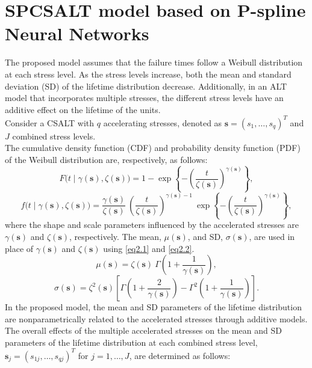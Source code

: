 \documentclass[twoside]{article}
\begin{document}
\section{SPCSALT model based on P-spline Neural Networks}\label{sec2}
The proposed model assumes that the failure times follow a Weibull distribution at each stress level. As the stress levels increase, both the mean and standard deviation (SD) of the lifetime distribution decrease. Additionally, in an ALT model that incorporates multiple stresses, the different stress levels have an additive effect on the lifetime of the units.\\
Consider a CSALT with $q$ accelerating stresses, denoted as $\boldsymbol{s}=(s_{1},\ldots,s_{q})^{T}$ and $J$ combined stress levels.\\
The cumulative density function (CDF) and probability density function (PDF) of the Weibull distribution are, respectively, as follows: 
\begin{equation*}
F\big(t \mid \gamma(\boldsymbol{s}), \zeta(\boldsymbol{s}) \big) = 1  - \exp\left\{ -\left(\dfrac{t}{\zeta(\boldsymbol{s})}\right)^{\gamma(\boldsymbol{s})} \right\},
\end{equation*}
\begin{equation*}
f\big(t \mid \gamma(\boldsymbol{s}), \zeta(\boldsymbol{s}) \big) = \dfrac{\gamma(\boldsymbol{s})}{\zeta(\boldsymbol{s})} \: \left(\dfrac{t}{\zeta(\boldsymbol{s})}\right)^{\gamma(\boldsymbol{s}) - 1} \: \exp\left\{ -\left(\dfrac{t}{\zeta(\boldsymbol{s})}\right)^{\gamma(\boldsymbol{s})} \right\},
\end{equation*}
where the shape and scale parameters influenced by the accelerated stresses are $\gamma(\boldsymbol{s})$ and $\zeta(\boldsymbol{s})$, respectively. The mean, $\mu(\boldsymbol{s})$, and SD, $\sigma(\boldsymbol{s})$, are used in place of $\gamma(\boldsymbol{s})$ and $\zeta(\boldsymbol{s})$ using \eqref{eq2.1} and \eqref{eq2.2}.
\begin{equation}\label{eq2.1}
\mu(\boldsymbol{s}) = \zeta(\boldsymbol{s}) \: \Gamma\left(1 + \frac{1}{\gamma(\boldsymbol{s})}\right),
\end{equation}
\begin{equation}\label{eq2.2}
\sigma(\boldsymbol{s}) = \zeta^2(\boldsymbol{s})\left[\Gamma\left(1 + \frac{2}{\gamma(\boldsymbol{s})}\right) - \Gamma^2\left(1 + \frac{1}{\gamma(\boldsymbol{s})}\right) \right].
\end{equation}
In the proposed model, the mean and SD parameters of the lifetime distribution are nonparametrically related to the accelerated stresses through additive models. The overall effects of the multiple accelerated stresses on the mean and SD parameters of the lifetime distribution at each combined stress level, $\boldsymbol{s}_{j}=(s_{1j},\ldots,s_{qj})^{T}$ for $j=1,\ldots,J$, are determined as follows:
\end{document}
